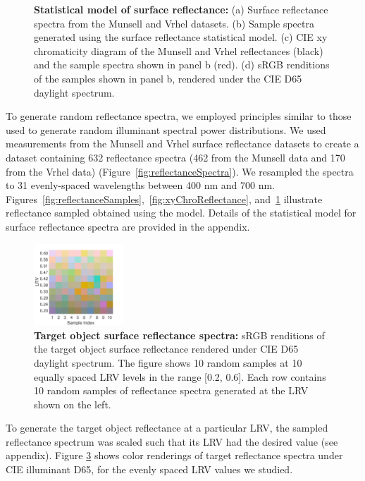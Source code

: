 \documentclass{jov}
\begin{document}
\begin{figure}
\begin{subfigure}{0.24 \textwidth}
        \label{fig:backgroundSwatches}
    \end{subfigure}
    \caption{{\bf Statistical model of surface reflectance:} (a) Surface reflectance spectra from the Munsell and Vrhel datasets. (b) Sample spectra generated using the surface reflectance statistical model. (c) CIE xy chromaticity diagram of the Munsell and Vrhel reflectances (black) and the sample spectra shown in panel b (red). (d) sRGB renditions of the samples shown in panel b, rendered under the CIE D65 daylight spectrum.}
\label{fig:surfaceReflectanceGeneration}
\end{figure}

To generate random reflectance spectra, we employed principles similar to those used to generate random illuminant spectral power distributions.
We used measurements from the Munsell \cite{kelly1943tristimulus} and Vrhel \cite{vrhel1994measurement} surface reflectance datasets to create a dataset containing 632 reflectance spectra (462 from the Munsell data and 170 from the Vrhel data) (Figure~\ref{fig:reflectanceSpectra}).
We resampled the spectra to 31 evenly-spaced wavelengths between 400 nm and 700 nm.
Figures~\ref{fig:reflectanceSamples},~\ref{fig:xyChroReflectance}, and~\ref{fig:backgroundSwatches} illustrate reflectance sampled obtained using the model. 
Details of the statistical model for surface reflectance spectra are provided in the appendix. 

\begin{figure}
\centering
\includegraphics[width=0.3\textwidth]{../FiguresDraft5/Figure8/Figure8.pdf}
\caption{{\bf Target object surface reflectance spectra:} sRGB renditions of the target object surface reflectance rendered under CIE D65 daylight spectrum. The figure shows 10 random samples at 10 equally spaced LRV levels in the range [0.2, 0.6]. Each row contains 10 random samples of reflectance spectra generated at the LRV shown on the left.}
\label{fig:targetSwatches}
\end{figure}

To generate the target object reflectance at a particular LRV, the sampled reflectance spectrum was 
scaled such that its LRV had the desired value (see appendix).
Figure \ref{fig:targetSwatches} shows color renderings of target reflectance spectra under CIE illuminant D65, for the evenly spaced LRV values we studied.
\end{document}
